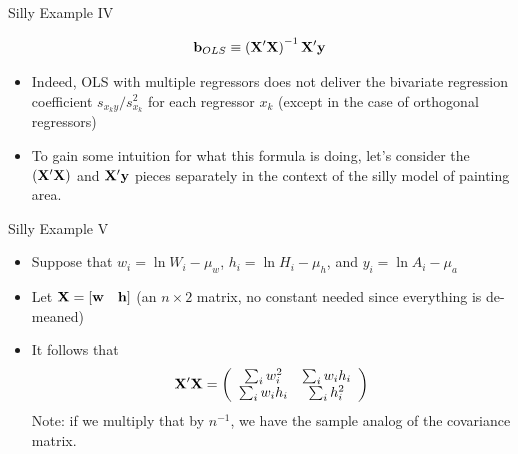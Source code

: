 \documentclass[aspectratio=169,11pt]{beamer}
\begin{document}
\begin{frame}{Silly Example IV}

	\[
	{\bf b}_{OLS} \equiv  \left({\bf X}'{\bf X}\right)^{-1} {\bf X}' {\bf y} 
	\]


	\begin{itemize}
	\item Indeed, OLS with multiple regressors does not deliver 
	the bivariate regression coefficient $s_{x_{k}y}/s_{x_{k}}^{2}$ for each regressor $x_{k}$
	(except in the case of orthogonal regressors)

	\bigskip
	\item To gain some intuition for what this formula is doing, let's consider the $ \left({\bf X}'{\bf X}\right)$
	and ${\bf X}' {\bf y} $ pieces separately in the context of the silly model of painting area.


\end{itemize}
\end{frame}






\begin{frame}{Silly Example V}


	\begin{itemize}
	\item Suppose that $w_{i}=\ln W_{i}-\mu_{w}$, $h_{i}=\ln H_{i}-\mu_{h}$, and $y_{i}=\ln A_{i}-\mu_{a}$


	\item Let ${\bf X}=\left[{\bf w}\quad{\bf h}\right]$ (an $n\times 2$ matrix, no constant needed since everything is de-meaned)

	\item It follows that 
\[
{\bf X}'{\bf X}=\left(\begin{array}{cc}
\sum_{i} w_{i}^{2} & \sum_{i} w_{i}h_{i}\\
\sum_{i} w_{i}h_{i} & \sum_{i} h_{i}^{2}
\end{array}\right)
\]
Note: if we multiply that by $n^{-1}$, we have the sample analog of the
covariance matrix. 
	
\end{itemize}
\end{frame}
\end{document}
